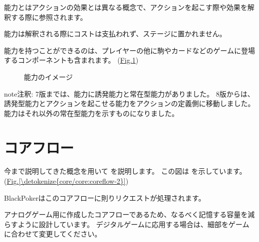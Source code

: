 \documentclass[letterpaper,10pt,dvipdfmx]{sphinxmanual}
\renewcommand{\spxentry}{\item}
\begin{document}
\sphinxAtStartPar
能力とはアクションの効果とは異なる概念で、アクションを起こす際や効果を解釈する際に参照されます。

\sphinxAtStartPar
能力は解釈される際にコストは支払われず、ステージに置かれません。

\sphinxAtStartPar
能力を持つことができるのは、プレイヤーの他に駒やカードなどのゲームに登場するコンポーネントも含まれます。
(\hyperref[\detokenize{core/core:ability-image}]{Fig.\@ \ref{\detokenize{core/core:ability-image}}})

\begin{figure}[htbp]
\centering
\capstart

\noindent{}
\caption{能力のイメージ}\label{\detokenize{core/core:id38}}\label{\detokenize{core/core:ability-image}}\end{figure}

\begin{sphinxadmonition}{note}{注釈:}
\sphinxAtStartPar
7版までは、能力に誘発能力と常在型能力がありました。
8版からは、誘発型能力とアクションを起こせる能力をアクションの定義側に移動しました。
能力はそれ以外の常在型能力を示すものになりました。
\end{sphinxadmonition}

\index{コアフロー@\spxentry{コアフロー}}\ignorespaces 

\section{コアフロー}
\label{\detokenize{core/core:coreflowsec}}\label{\detokenize{core/core:index-19}}\label{\detokenize{core/core:id25}}
\sphinxAtStartPar
今まで説明してきた概念を用いて  を説明します。
この図は  を示しています。(\hyperref[\detokenize{core/core:coreflow-2}]{Fig.\@ \ref{\detokenize{core/core:coreflow-2}}})

\sphinxAtStartPar
BlackPokerはこのコアフローに則りリクエストが処理されます。

\sphinxAtStartPar
アナログゲーム用に作成したコアフローであるため、なるべく記憶する容量を減らすように設計しています。
デジタルゲームに応用する場合は、細部をゲームに合わせて変更してください。
\end{document}
